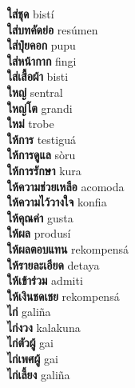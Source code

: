 \textbf{ ใส่ชุด  } bistí \\
\textbf{ ใส่บทคัดย่อ  } resúmen \\
\textbf{ ใส่ปุ๋ยคอก  } pupu \\
\textbf{ ใส่หน้ากาก  } fingi \\
\textbf{ ใส่เสื้อผ้า  } bisti \\
\textbf{ ใหญ่  } sentral \\
\textbf{ ใหญ่โต  } grandi \\
\textbf{ ใหม่  } trobe \\
\textbf{ ให้การ  } testiguá \\
\textbf{ ให้การดูแล  } sòru \\
\textbf{ ให้การรักษา  } kura \\
\textbf{ ให้ความช่วยเหลือ  } acomoda \\
\textbf{ ให้ความไว้วางใจ  } konfia \\
\textbf{ ให้คุณค่า  } gusta \\
\textbf{ ให้ผล  } produsí \\
\textbf{ ให้ผลตอบแทน  } rekompensá \\
\textbf{ ให้รายละเอียด  } detaya \\
\textbf{ ให้เข้าร่วม  } admiti \\
\textbf{ ให้เงินชดเชย  } rekompensá \\
\textbf{ ไก่  } galiña \\
\textbf{ ไก่งวง  } kalakuna \\
\textbf{ ไก่ตัวผู้  } gai \\
\textbf{ ไก่เพศผู้  } gai \\
\textbf{ ไก่เลี้ยง  } galiña \\
